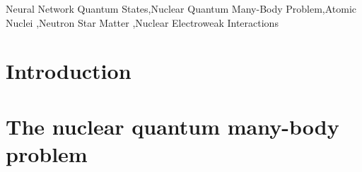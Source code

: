 \begin{frontmatter}
        \begin{abstract}
        A long-standing goal of nuclear theory is to explain how the structure and dynamics of atomic nuclei and neutron-star matter emerge from the underlying interactions among protons and neutrons. Achieving this goal requires solving the nuclear quantum many-body problem with high accuracy across a wide range of length scales and density regimes. In this review, we discuss how artificial neural network representations of the nuclear many-body wave function have significantly extended the capabilities of continuum quantum Monte Carlo methods. In particular, neural-network quantum states enable calculations of larger systems than were previously accessible and provide a flexible framework for capturing phenomena that challenge conventional approaches, including the emergence of nuclear clusters and superfluid phases in dense matter. We highlight recent applications to finite nuclei, infinite nuclear and neutron matter, and dynamical processes relevant to lepton–nucleus and nucleus–nucleus scattering. We also discuss conceptual and methodological connections with condensed matter physics, emphasizing developments in neural-network quantum states that bridge strongly correlated systems across disciplines. Together, these developments demonstrate how neural-network methods open new avenues toward unified and accurate descriptions of nuclear structure, matter, and reactions.
        \end{abstract}
        		
        \begin{keyword}
        Neural Network Quantum States\sep Nuclear Quantum Many-Body Problem\sep Atomic Nuclei \sep Neutron Star Matter \sep Nuclear Electroweak Interactions
        \end{keyword}
		
	\end{frontmatter}
	
	\newpage
	
	\thispagestyle{empty}
	\tableofcontents
	
	
	

\newpage
\section{Introduction}
\label{sec:intro}

\newpage
\section{The nuclear quantum many-body problem}
\label{sec:nmbp}


